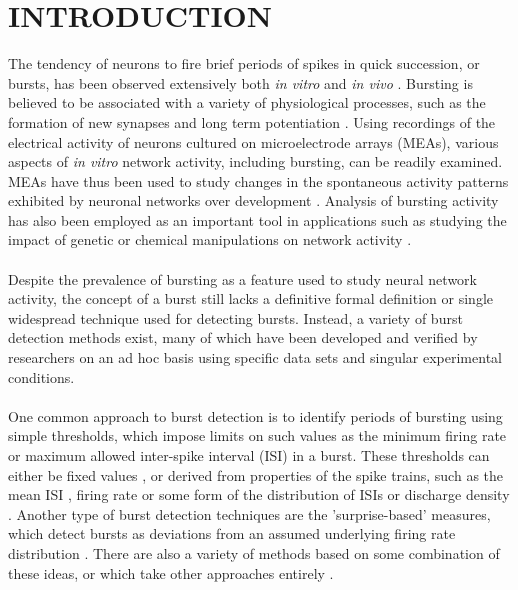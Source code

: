 \documentclass[12pt, titlepage]{article}
\begin{document}
	\section*{INTRODUCTION}
	The tendency of neurons to fire brief periods of spikes in quick succession, or bursts, has been observed extensively both \textit{in vitro} and \textit{in vivo} \cite{Weyand2001,Pasquale2010}. Bursting is believed to be associated with a variety of physiological processes, such as the formation of new synapses \cite{Maeda1995} and long term potentiation \cite{Lisman1997}. Using recordings of the electrical activity of neurons cultured on microelectrode arrays (MEAs), various aspects of \textit{in vitro} network activity, including bursting, can be readily examined. MEAs have thus been used to study changes in the spontaneous activity patterns exhibited by neuronal networks over development \cite{Wagenaar2006,Charlesworth2015}. Analysis of bursting activity has also been employed as an important tool in applications such as studying the impact of genetic or chemical manipulations on network activity \cite{Eisenman2015,Charlesworth2016}. 
	\\ \\ Despite the prevalence of bursting as a feature used to study neural network activity, the concept of a burst still lacks a definitive formal definition \cite{Cocatre-Zilgien1992} or single widespread technique used for detecting bursts. Instead, a variety of burst detection methods exist, many of which have been developed and verified by researchers on an ad hoc basis using specific data sets and singular experimental conditions. 
	\\\\One common approach to burst detection is to identify periods of bursting using simple thresholds, which impose limits on such values as the minimum firing rate or maximum allowed inter-spike interval (ISI) in a burst. These thresholds can either be fixed values  \cite{Cocatre-Zilgien1992,Chiappalone2005,Mukai2003},  or derived from properties of the spike trains, such as the mean ISI \cite{Chen2009}, firing rate \cite{Pimashkin2011} or some form of the distribution of ISIs or discharge density \cite{Selinger2007,Pasquale2010,Kaneoke1996,Bakkum2013,Kapucu2012}. Another type of burst detection techniques are the 'surprise-based' measures, which detect bursts as deviations from an assumed underlying firing rate distribution \cite{Legendy1985,Ko2012,Gourevitch2007}. There are also a variety of methods based on some combination of these ideas, or which take other approaches entirely \cite{Hennig2011,Tokdar2010,Turnbull2005,Tam2002,Xia2003,Wagenaar2005,Weihberger2013}.
\end{document}
